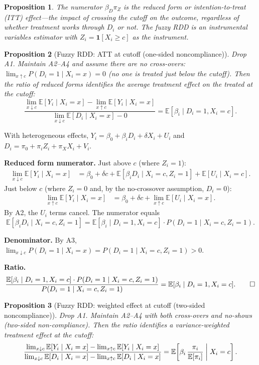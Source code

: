 \documentclass[12pt,a4paper]{article}
\theoremstyle{plain}
\newtheorem{propositio}{Proposition}[section]
\theoremstyle{definition}
\renewenvironment{proof}{\pushQED{\qed}\normalfont}{\popQED\par\nobreak}
\newcommand{\E}{\mathbb{E}}
\begin{document}
\begin{propositio}
  The numerator $\beta_D\pi_Z$ is the \emph{reduced form} or \emph{intention-to-treat} (ITT) effect—the impact of crossing the cutoff on the outcome, regardless of whether treatment works through $D_i$ or not.  The fuzzy RDD is an instrumental variables estimator with $Z_i=\mathbf{1}[X_i\ge c]$ as the instrument.
\end{propositio}

\begin{propositio}[Fuzzy RDD: ATT at cutoff (one-sided noncompliance)\label{prop:frdd_onesided}]
Drop A1.  Maintain A2--A4 and assume there are no cross-overs: $\lim_{x\uparrow c}P(D_i=1\mid X_i=x)=0$ (no one is treated just below the cutoff).
Then the ratio of reduced forms identifies the average treatment effect on the treated at the cutoff:
\[
  \frac{\lim_{x\downarrow c}\E[Y_i\mid X_i=x]-\lim_{x\uparrow c}\E[Y_i\mid X_i=x]}
       {\lim_{x\downarrow c}\E[D_i\mid X_i=x]-0}
  = \E[\beta_i\mid D_i=1, X_i=c].
\]
\end{propositio}

\begin{proof}
With heterogeneous effects, $Y_i=\beta_0+\beta_i D_i+\delta X_i+U_i$ and $D_i=\pi_0+\pi_i Z_i+\pi_X X_i+V_i$.

\textbf{Reduced form numerator.}  Just above $c$ (where $Z_i=1$):
\begin{align*}
  \lim_{x\downarrow c}\E[Y_i\mid X_i=x]
  &= \beta_0+\delta c+\E[\beta_i D_i\mid X_i=c,Z_i=1]+\E[U_i\mid X_i=c].
\end{align*}
Just below $c$ (where $Z_i=0$ and, by the no-crossover assumption, $D_i=0$):
\begin{align*}
  \lim_{x\uparrow c}\E[Y_i\mid X_i=x]
  &= \beta_0+\delta c+\lim_{x\uparrow c}\E[U_i\mid X_i=x].
\end{align*}
By A2, the $U_i$ terms cancel.  The numerator equals
\[
  \E[\beta_i D_i\mid X_i=c,Z_i=1]
  = \E[\beta_i\mid D_i=1,X_i=c]\cdot P(D_i=1\mid X_i=c, Z_i=1).
\]

\textbf{Denominator.}  By A3, $\lim_{x\downarrow c}P(D_i=1\mid X_i=x)=P(D_i=1\mid X_i=c, Z_i=1)>0$.

\textbf{Ratio.}
\[
  \frac{\E[\beta_i\mid D_i=1,X_i=c]\cdot P(D_i=1\mid X_i=c,Z_i=1)}
       {P(D_i=1\mid X_i=c,Z_i=1)}
  = \E[\beta_i\mid D_i=1,X_i=c]. \qedhere
\]
\end{proof}

\begin{propositio}[Fuzzy RDD: weighted effect at cutoff (two-sided noncompliance)\label{prop:frdd_twosided}]
Drop A1.  Maintain A2--A4 with both cross-overs and no-shows (two-sided non-compliance).
Then the ratio identifies a variance-weighted treatment effect at the cutoff:
\[
  \frac{\lim_{x\downarrow c}\E[Y_i\mid X_i=x]-\lim_{x\uparrow c}\E[Y_i\mid X_i=x]}
       {\lim_{x\downarrow c}\E[D_i\mid X_i=x]-\lim_{x\uparrow c}\E[D_i\mid X_i=x]}
  = \E\!\left[\beta_i\,\frac{\pi_i}{\E[\pi_i]}\biggm| X_i=c\right].
\]
\end{propositio}
\end{document}
